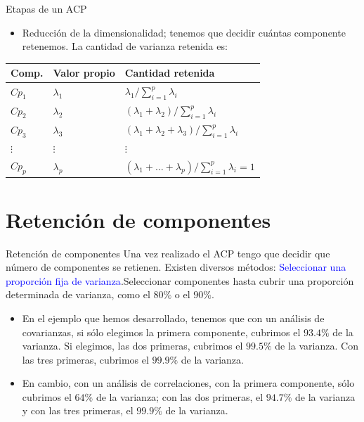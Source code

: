 \documentclass[
  ignorenonframetext,
]{beamer}
\providecommand{\tightlist}{%
  \setlength{\itemsep}{0pt}\setlength{\parskip}{0pt}}
\newcommand\blue[1]{\textcolor{blue}{#1}}
\begin{document}
\begin{frame}{Etapas de un ACP}
\protect\hypertarget{etapas-de-un-acp-2}{}
\begin{itemize}
\tightlist
\item
  Reducción de la dimensionalidad; tenemos que decidir cuántas
  componente retenemos. La cantidad de varianza retenida es:
\end{itemize}

\begin{table}
\centering
\begin{tabular}{|l|l|l|}\hline
Comp. & Valor propio & Cantidad retenida\\\hline
$Cp_1$& $\lambda_1$ & $\lambda_1/\sum_{i=1}^p \lambda_i$\\
$Cp_2 $ & $\lambda_2$ & $(\lambda_1+\lambda_2)/\sum_{i=1}^p \lambda_i$\\
$Cp_3$ & $\lambda_3$ &
$(\lambda_1+\lambda_2+\lambda_3)/\sum_{i=1}^p
\lambda_i$\\ $\vdots$ & $\vdots$ & $\vdots$\\
$Cp_p$ & $\lambda_p$ &
$(\lambda_1+\ldots+\lambda_p)/\sum_{i=1}^p\lambda_i=1$\\\hline
\end{tabular}
\end{table}
\end{frame}

\hypertarget{retenciuxf3n-de-componentes}{%
\section{Retención de componentes}\label{retenciuxf3n-de-componentes}}

\begin{frame}{Retención de componentes}
\protect\hypertarget{retenciuxf3n-de-componentes-1}{}
Una vez realizado el ACP tengo que decidir que número de componentes se
retienen. Existen diversos métodos:
\blue{Seleccionar una proporción fija de varianza}.Seleccionar
componentes hasta cubrir una proporción determinada de varianza, como el
\(80\%\) o el \(90\%\).

\begin{itemize}
\tightlist
\item
  En el ejemplo que hemos desarrollado, tenemos que con un análisis de
  covarianzas, si sólo elegimos la primera componente, cubrimos el
  \(93.4\%\) de la varianza. Si elegimos, las dos primeras, cubrimos el
  \(99.5\%\) de la varianza. Con las tres primeras, cubrimos el
  \(99.9\%\) de la varianza.
\item
  En cambio, con un análisis de correlaciones, con la primera
  componente, sólo cubrimos el \(64\%\) de la varianza; con las dos
  primeras, el \(94.7\%\) de la varianza y con las tres primeras, el
  \(99.9\%\) de la varianza.
\end{itemize}
\end{frame}
\end{document}
